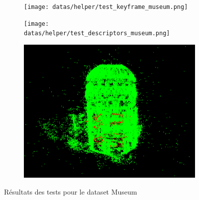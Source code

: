 \begin{figure}[ht]
    \centering
    \begin{subfigure}{0.7\textwidth}
        \texttt{[image: datas/helper/test\_keyframe\_museum.png]}
    \end{subfigure}

    \begin{subfigure}{0.7\textwidth}
        \texttt{[image: datas/helper/test\_descriptors\_museum.png]}
    \end{subfigure}

    \begin{subfigure}{0.7\textwidth}
        \includegraphics[width=\linewidth]{datas/helper/test_pointcloud_museum.png}
    \end{subfigure}

    \caption{Résultats des tests pour le dataset Museum}
    \label{fig:test_museum}
\end{figure}